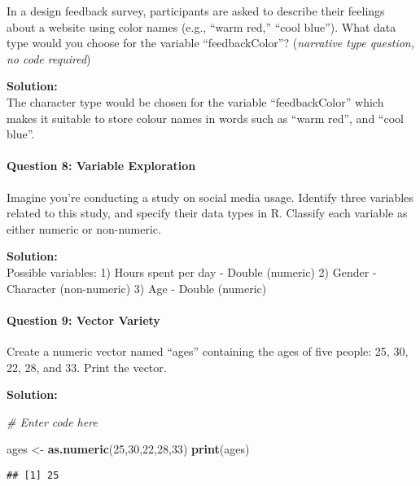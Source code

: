 \documentclass[
]{article}
\newenvironment{Shaded}{\begin{snugshade}}{\end{snugshade}}
\newcommand{\CommentTok}[1]{\textcolor[rgb]{0.56,0.35,0.01}{\textit{#1}}}
\newcommand{\DecValTok}[1]{\textcolor[rgb]{0.00,0.00,0.81}{#1}}
\newcommand{\FunctionTok}[1]{\textcolor[rgb]{0.13,0.29,0.53}{\textbf{#1}}}
\newcommand{\NormalTok}[1]{#1}
\newcommand{\OtherTok}[1]{\textcolor[rgb]{0.56,0.35,0.01}{#1}}
\begin{document}
In a design feedback survey, participants are asked to describe their
feelings about a website using color names (e.g., ``warm red,'' ``cool
blue''). What data type would you choose for the variable
``feedbackColor''? (\emph{narrative type question, no code required})

\textbf{Solution:}\\
The character type would be chosen for the variable ``feedbackColor''
which makes it suitable to store colour names in words such as ``warm
red'', and ``cool blue''.

\hypertarget{question-8-variable-exploration}{%
\paragraph{Question 8: Variable
Exploration}\label{question-8-variable-exploration}}

Imagine you're conducting a study on social media usage. Identify three
variables related to this study, and specify their data types in R.
Classify each variable as either numeric or non-numeric.

\textbf{Solution:}\\
Possible variables: 1) Hours spent per day - Double (numeric) 2) Gender
- Character (non-numeric) 3) Age - Double (numeric)

\hypertarget{question-9-vector-variety}{%
\paragraph{Question 9: Vector Variety}\label{question-9-vector-variety}}

Create a numeric vector named ``ages'' containing the ages of five
people: 25, 30, 22, 28, and 33. Print the vector.

\textbf{Solution:}

\begin{Shaded}
\begin{Highlighting}[]
\CommentTok{\# Enter code here}

\NormalTok{ages }\OtherTok{\textless{}{-}} \FunctionTok{as.numeric}\NormalTok{(}\DecValTok{25}\NormalTok{,}\DecValTok{30}\NormalTok{,}\DecValTok{22}\NormalTok{,}\DecValTok{28}\NormalTok{,}\DecValTok{33}\NormalTok{)}
\FunctionTok{print}\NormalTok{(ages)}
\end{Highlighting}
\end{Shaded}

\begin{verbatim}
## [1] 25
\end{verbatim}
\end{document}
